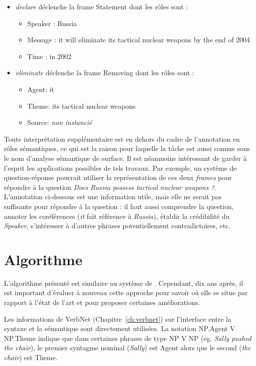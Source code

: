 \begin{itemize}
    \item \emph{declare} déclenche la frame Statement dont les rôles sont :
    \begin{itemize}
        \item Speaker : Russia
        \item Message : it will eliminate its tactical nuclear weapons by the end of 2004
        \item Time : in 2002
    \end{itemize}
    \item \emph{eliminate} déclenche la frame Removing dont les rôles sont :
    \begin{itemize}
        \item Agent: it
        \item Theme: its tactical nuclear weapons
        \item Source: \emph{non instancié}
    \end{itemize}
\end{itemize}

Toute interprétation supplémentaire est en dehors du cadre de l'annotation en
rôles sémantiques, ce qui est la raison pour laquelle la tâche est aussi connue
sous le nom d'analyse sémantique de surface. Il est néanmoins intéressant de
garder à l'esprit les applications possibles de tels travaux. Par exemple, un
système de question-réponse pourrait utiliser la représentation de ces deux
\emph{frames} pour répondre à la question \emph{Does Russia possess tactical
nuclear weapons ?}. L'annotation ci-dessous est une information utile, mais
elle ne serait pas suffisante pour répondre à la question : il faut aussi
comprendre la question, annoter les coréférences (\emph{it} fait référence à
\emph{Russia}), établir la crédibilité du \emph{Speaker}, s'intéresser à
d'autres phrases potentiellement contradictoires, etc.

\section{Algorithme}

L'algorithme présenté est similaire au système de
\cite{swier2004unsupervised,swier2005exploiting}. Cependant, dix ans après, il
est important d'évaluer à nouveau cette approche pour savoir où elle se situe
par rapport à l'état de l'art et pour proposer certaines améliorations.

Les informations de VerbNet (Chapitre~\ref{ch:verbnet}) sur l'interface entre
la syntaxe et la sémantique sont directement utilisées. La notation NP.Agent V
NP.Theme indique que dans certaines phrases de type NP V NP (eg. \emph{Sally
pushed the chair}), le premier syntagme nominal (\emph{Sally}) est Agent alors
que le second (\emph{the chair}) est Theme.

